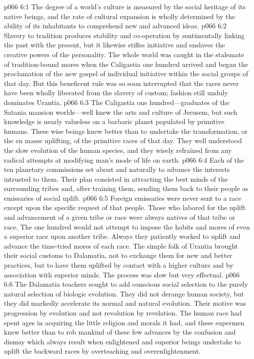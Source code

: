 \vs p066 6:1 The degree of a world’s culture is measured by the social heritage of its native beings, and the rate of cultural expansion is wholly determined by the ability of its inhabitants to comprehend new and advanced ideas.
\vs p066 6:2 Slavery to tradition produces stability and co\hyp{}operation by sentimentally linking the past with the present, but it likewise stifles initiative and enslaves the creative powers of the personality. The whole world was caught in the stalemate of tradition\hyp{}bound mores when the Caligastia one hundred arrived and began the proclamation of the new gospel of individual initiative within the social groups of that day. But this beneficent rule was so soon interrupted that the races never have been wholly liberated from the slavery of custom; fashion still unduly dominates Urantia.
\vs p066 6:3 The Caligastia one hundred---graduates of the Satania mansion worlds---well knew the arts and culture of Jerusem, but such knowledge is nearly valueless on a barbaric planet populated by primitive humans. These wise beings knew better than to undertake the  transformation, or the en masse uplifting, of the primitive races of that day. They well understood the slow evolution of the human species, and they wisely refrained from any radical attempts at modifying man’s mode of life on earth.\plusone
\vs p066 6:4 Each of the ten planetary commissions set about  and naturally to advance the interests intrusted to them. Their plan consisted in attracting the best minds of the surrounding tribes and, after training them, sending them back to their people as emissaries of social uplift.
\vs p066 6:5 Foreign emissaries were never sent to a race except upon the specific request of that people. Those who labored for the uplift and advancement of a given tribe or race were always natives of that tribe or race. The one hundred would not attempt to impose the habits and mores of even a superior race upon another tribe. Always they patiently worked to uplift and advance the time\hyp{}tried mores of each race. The simple folk of Urantia brought their social customs to Dalamatia, not to exchange them for new and better practices, but to have them uplifted by contact with a higher culture and by association with superior minds. The process was slow but very effectual.
\vs p066 6:6 The Dalamatia teachers sought to add conscious social selection to the purely natural selection of biologic evolution. They did not derange human society, but they did markedly accelerate its normal and natural evolution. Their motive was progression by evolution and not revolution by revelation. The human race had spent ages in acquiring the little religion and morals it had, and these supermen knew better than to rob mankind of these few advances by the confusion and dismay which always result when enlightened and superior beings undertake to uplift the backward races by overteaching and overenlightenment.
